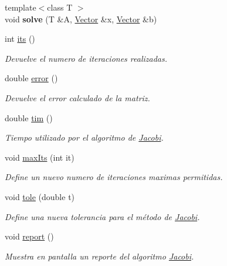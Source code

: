 \begin{DoxyCompactItemize}
\item 
\hypertarget{class_gauss_seidel_a5453a198069d92b78e0eda9c9e779508}{}\label{class_gauss_seidel_a5453a198069d92b78e0eda9c9e779508} 
{\footnotesize template$<$class T $>$ }\\void {\bfseries solve} (T \&A, \hyperlink{class_vector}{Vector} \&x, \hyperlink{class_vector}{Vector} \&b)
\item 
int \hyperlink{class_gauss_seidel_af6e2a4215cc0127b156269ee65e2d5a3}{its} ()
\begin{DoxyCompactList}\small\item\em Devuelve el numero de iteraciones realizadas. \end{DoxyCompactList}\item 
double \hyperlink{class_gauss_seidel_ae78a52240f0d1a67e08a0ac280f87d95}{error} ()
\begin{DoxyCompactList}\small\item\em Devuelve el error calculado de la matriz. \end{DoxyCompactList}\item 
double \hyperlink{class_gauss_seidel_a78d7823a16dd20eb30452ef340320a72}{tim} ()
\begin{DoxyCompactList}\small\item\em Tiempo utilizado por el algoritmo de \hyperlink{class_jacobi}{Jacobi}. \end{DoxyCompactList}\item 
void \hyperlink{class_gauss_seidel_aa52a83ac794ad85dcfbff4782a2a4f1d}{max\+Its} (int it)
\begin{DoxyCompactList}\small\item\em Define un nuevo numero de iteraciones maximas permitidas. \end{DoxyCompactList}\item 
void \hyperlink{class_gauss_seidel_a6df722abff1a051a0659a42224ff28c3}{tole} (double t)
\begin{DoxyCompactList}\small\item\em Define una nueva tolerancia para el método de \hyperlink{class_jacobi}{Jacobi}. \end{DoxyCompactList}\item 
void \hyperlink{class_gauss_seidel_acfa57a8a814d10c304f83144ed87b442}{report} ()
\begin{DoxyCompactList}\small\item\em Muestra en pantalla un reporte del algoritmo \hyperlink{class_jacobi}{Jacobi}. \end{DoxyCompactList}\end{DoxyCompactItemize}


